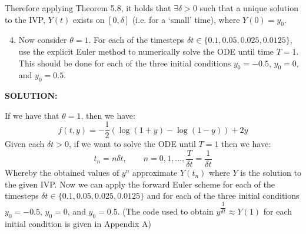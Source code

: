 \documentclass[]{article}
\begin{document}
\noindent Therefore applying Theorem 5.8, it holds that $\exists \delta > 0$ such that a unique solution to the IVP, $Y(t)$ exists on $[0,\delta]$ (i.e. for a `small' time), where $Y(0) = y_0$.

\begin{enumerate}
    \setcounter{enumi}{3}
  \item Now consider $\theta = 1$. For each of the timesteps $\delta t \in \{0.1,0.05,0.025,0.0125\}$, use the explicit Euler method to numerically solve the ODE until time $T = 1$. This should be done for each of the three initial conditions $y_0 = -0.5$, $y_0 = 0$, and $y_0 = 0.5$.
  \end{enumerate}


  \noindent \textbf{SOLUTION:} \newline

    \noindent If we have that $\theta = 1$, then we have:
    \[
    f(t,y) = -\frac{1}{2}\left(\log(1+y) - \log(1-y)\right) + 2y
    \]
    \noindent Given each $\delta t > 0$, if we want to solve the ODE until $T=1$ then we have:
    \[
    t_n = n \delta t, \qquad n=0,1,\dots , \dfrac{T}{\delta t} =  \dfrac{1}{\delta t}
    \]
    \noindent Whereby the obtained values of $y^n$ approximate $Y(t_n)$ where $Y$ is the solution to the given IVP. Now we can apply the forward Euler scheme for each of the timesteps $\delta t \in \{0.1,0.05,0.025,0.0125\}$ and for each of the three initial conditions $y_0 = -0.5$, $y_0 = 0$, and $y_0 = 0.5$. (The code used to obtain $y^{\dfrac{1}{\delta t}} \approx Y(1)$ for each initial condition is given in Appendix A)\newline   
\end{document}
